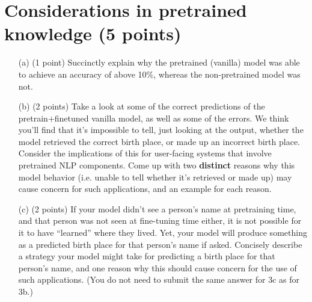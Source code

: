 \documentclass[letterpaper,12pt]{article}
\begin{document}
	
	\section{Considerations in pretrained knowledge (5 points)}
	
	\begin{itemize}
		\item[(a)]
			(1 point) Succinctly explain why the pretrained (vanilla) model was able to achieve an accuracy of above 10\%, whereas the non-pretrained model was not.
		\item[(b)]
			(2 points) Take a look at some of the correct predictions of the pretrain+finetuned vanilla model, as well as some of the errors. We think you'll find that it's impossible to tell, just looking at the output, whether the model retrieved the correct birth place, or made up an incorrect birth place. Consider the implications of this for user-facing systems that involve pretrained NLP components. Come up with two \textbf{distinct} reasons why this model behavior (i.e. unable to tell whether it's retrieved or made up) may cause concern for such applications, and an example for each reason.
		\item[(c)] 
			(2 points) If your model didn't see a person's name at pretraining time, and that person was not seen at fine-tuning time either, it is not possible for it to have “learned” where they lived. Yet, your model will produce something as a predicted birth place for that person's name if asked. Concisely describe a strategy your model might take for predicting a birth place for that person's name, and one reason why this should cause concern for the use of such applications. (You do not need to submit the same answer for 3c as for 3b.)
	\end{itemize}
	
	
	
\end{document}
